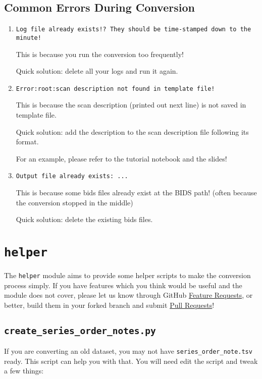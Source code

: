 \documentclass[12pt]{myland}
\def\<#1>{\texttt{#1}}
\begin{document}
    \subsection{Common Errors During Conversion}
    \begin{enumerate}[itemsep=5pt]
        \item \<Log file already exists!?  They should be time-stamped down to the minute!> \par
            This is because you run the conversion too frequently! \par
            \color{red}Quick solution: \color{black}delete all your logs and run it again.

        \item \<Error:root:scan description not found in template file!> \par
            This is because the scan description (printed out next line) is not saved in template file. \par
            \color{red}Quick solution: \color{black}add the description to the scan description file following
            its format. \par
            For an example, please refer to the tutorial notebook and the slides!

        \item \<Output file already exists: ...> \par
            This is because some bids files already exist at the BIDS path! (often because the conversion stopped in
            the middle) \par
            \color{red}Quick solution: \color{black}delete the existing bids files.
    \end{enumerate}


\section{\<helper>}
The \<helper> module aims to provide some helper scripts to make the conversion process simply. If you have features which 
you think would be useful and the module does not cover, please let us know through GitHub
\href{https://github.com/MotivatedMemoryLab/biacpype/issues}{Feature Requests}, or better, build them in your forked
branch and submit \href{https://github.com/MotivatedMemoryLab/biacpype/pulls}{Pull Requests}!

\subsection{\<create\_series\_order\_notes.py>}
If you are converting an old dataset, you may not have \<series\_order\_note.tsv> ready. This script can help you with
that. You will need edit the script and tweak a few things:
\end{document}
